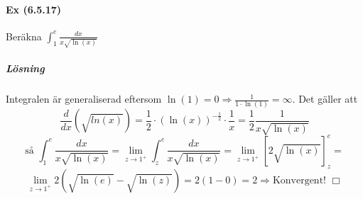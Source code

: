 \paragraph{Ex (6.5.17)} Beräkna $\int_1^e\frac{dx}{x\sqrt{\ln(x)}}$
\subparagraph{Lösning}
Integralen är generaliserad eftersom $\ln(1)=0\Rightarrow\frac{1}{1\cdot\ln(1)}=\infty$.
Det gäller att
\begin{equation*}
    \frac{d}{dx}(\sqrt{ln(x)})=
    \frac{1}{2}\cdot(\ln(x))^{-\frac{1}{2}}\cdot\frac{1}{x}=
    \frac{1}{2}\frac{1}{x\sqrt{\ln(x)}}
\end{equation*}
\begin{equation*}
    \text{så }\int_1^e\frac{dx}{x\sqrt{\ln(x)}}=
    \lim_{z\to 1^+}\int_z^e\frac{dx}{x\sqrt{\ln(x)}}=
    \lim_{z\to 1^+}[2\sqrt{\ln(x)}]_z^e=
\end{equation*}
\begin{equation*}
    \lim_{z\to 1^+}2(\sqrt{\ln(e)}-\sqrt{\ln(z)})=
    2(1-0)=2\Rightarrow\text{Konvergent! }\Box
\end{equation*}

